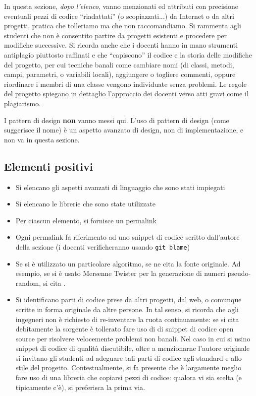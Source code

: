 \documentclass[a4paper,12pt]{report}
\begin{document}
In questa sezione, \textit{dopo l'elenco},
vanno menzionati ed attributi con precisione eventuali pezzi di codice ``riadattati'' (o scopiazzati...) da Internet o da altri progetti,
pratica che tolleriamo ma che non raccomandiamo.
%
Si rammenta agli studenti che non è consentito partire da progetti esistenti e procedere per modifiche successive.
%
Si ricorda anche che i docenti hanno in mano strumenti antiplagio piuttosto raffinati e che ``capiscono'' il codice e la storia delle modifiche del progetto,
per cui tecniche banali come cambiare nomi (di classi, metodi, campi, parametri, o variabili locali),
aggiungere o togliere commenti,
oppure riordinare i membri di una classe vengono individuate senza problemi.
%
Le regole del progetto spiegano in dettaglio l'approccio dei docenti verso atti gravi come il plagiarismo.

I pattern di design \textbf{non} vanno messi qui.
%
L'uso di pattern di design (come suggerisce il nome) è un aspetto avanzato di design, non di implementazione,
e non va in questa sezione.

\subsection*{Elementi positivi}

\begin{itemize}
	\item Si elencano gli aspetti avanzati di linguaggio che sono stati impiegati
	\item Si elencano le librerie che sono state utilizzate
	\item Per ciascun elemento, si fornisce un permalink
	\item Ogni permalink fa riferimento ad uno snippet di codice scritto dall'autore della sezione (i docenti verificheranno usando \texttt{git blame})
	\item Se si è utilizzato un particolare algoritmo, se ne cita la fonte originale.
	      Ad esempio, se si è usato Mersenne Twister per la generazione di numeri pseudo-random, si cita \cite{mersenne}.
	\item Si identificano parti di codice prese da altri progetti, dal web, o comunque scritte in forma originale da altre persone.
	      In tal senso, si ricorda che agli ingegneri non è richiesto di re-inventare la ruota continuamente:
	      se si cita debitamente la sorgente è tollerato fare uso di di snippet di codice open source per risolvere velocemente problemi non banali.
	      Nel caso in cui si usino snippet di codice di qualità discutibile,
	      oltre a menzionarne l'autore originale si invitano gli studenti ad adeguare tali parti di codice agli standard e allo stile del progetto.
	      Contestualmente, si fa presente che è largamente meglio fare uso di una libreria che copiarsi pezzi di codice:
	      qualora vi sia scelta (e tipicamente c'è), si preferisca la prima via.
\end{itemize}
\end{document}
